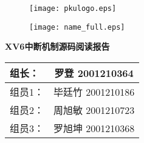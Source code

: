 \vspace*{1cm}

\begin{figure}[h]
    \centering
    \texttt{[image: pkulogo.eps]}
\end{figure}
\begin{figure}[h]
    \centering
    \texttt{[image: name\_full.eps]}
\end{figure}

\vspace*{0.5cm}

\begin{center}
    \Huge{\textbf{XV6中断机制源码阅读报告}}
\end{center}

\begin{table}[h]
    \centering
    \begin{large}
        \begin{tabular}{l c}
            组长：  & 罗登 2001210364   \\ \hline
            组员1： & 毕廷竹 2001210186 \\ \hline
            组员2： & 周旭敏 2001210723 \\ \hline
            组员3： & 罗旭坤 2001210368 \\ \hline

            \hline
        \end{tabular}
    \end{large}
\end{table}